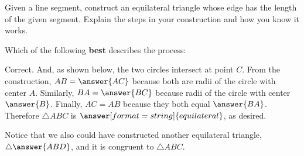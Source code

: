 \documentclass[nooutcomes]{ximera}
\begin{document}
\begin{problem}
Given a line segment, construct an equilateral triangle whose edge has the length of the given segment. Explain the steps in your construction and how you know it works.

\begin{image}
\end{image}


Which of the following \textbf{best} describes the process: 
\begin{multipleChoice} 
\end{multipleChoice}
  
\begin{problem}
Correct.  And, as shown below, the two circles intersect at point $C$.  From the construction, $AB = \answer{AC}$ because both are radii of the circle with center $A$.  Similarly, $BA = \answer{BC}$ because radii of the circle with center $\answer{B}$.  Finally, $AC=AB$ because they both equal $\answer{BA}$.  Therefore $\triangle ABC$ is 
$\answer[format=string]{equilateral}$, as desired.  

Notice that we also could have constructed another equilateral triangle, $\triangle \answer{ABD}$, and it is congruent to $\triangle{ABC}$.  


\end{problem}
\end{problem}
\end{document}
